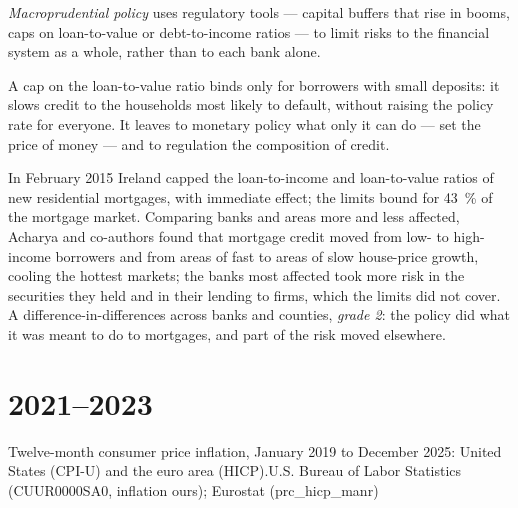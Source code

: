 \begin{definition}\label{def:b3:central-banking:macroprudential}
\emph{Macroprudential policy} uses regulatory tools --- capital buffers that rise in
booms, caps on loan-to-value or debt-to-income ratios --- to limit risks to the
financial system as a whole, rather than to each bank alone.
\end{definition}

A cap on the loan-to-value ratio binds only for borrowers with small deposits: it
slows credit to the households most likely to default, without raising the policy
rate for everyone. It leaves to monetary policy what only it can do --- set the
price of money --- and to regulation the composition of credit.

\begin{record}
In February 2015 Ireland capped the loan-to-income and loan-to-value ratios of new
residential mortgages, with immediate effect; the limits bound for 43~\% of the
mortgage market. Comparing banks and areas more and less affected, Acharya and
co-authors found that mortgage credit moved from low- to high-income borrowers and
from areas of fast to areas of slow house-price growth, cooling the hottest
markets; the banks most affected took more risk in the securities they held and
in their lending to firms, which the limits did not cover. %
A difference-in-differences across banks and counties, \emph{grade 2}: the policy
did what it was meant to do to mortgages, and part of the risk moved elsewhere.
\end{record}

\section{2021--2023}\label{sec:b3:central-banking:inflation}

\begin{omchart}{Twelve-month consumer price inflation, January 2019 to December 2025:
United States (CPI-U) and the euro area (HICP).}{U.S. Bureau of Labor Statistics
(CUUR0000SA0, inflation ours); Eurostat (prc\_hicp\_manr)}
\end{omchart}

